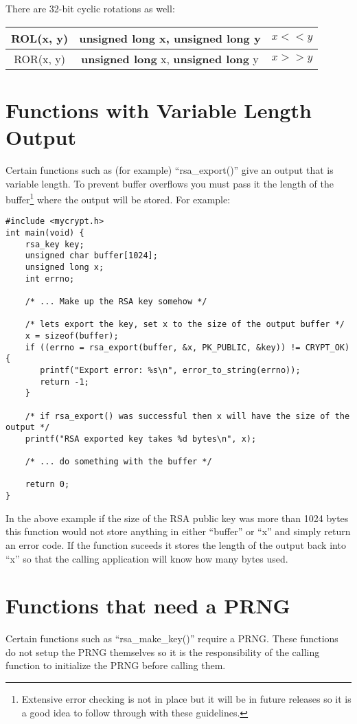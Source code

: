 \documentclass[b5paper]{book}
\begin{document}
There are 32-bit cyclic rotations as well:
 
\begin{center}
\begin{tabular}{|c|c|c|}
     \hline ROL(x, y) & {\bf unsigned long} x, {\bf unsigned long} y & $x << y$ \\
     \hline ROR(x, y) & {\bf unsigned long} x, {\bf unsigned long} y & $x >> y$ \\
     \hline
\end{tabular}
\end{center}

\section{Functions with Variable Length Output}
Certain functions such as (for example) ``rsa\_export()'' give an output that is variable length.  To prevent buffer overflows you
must pass it the length of the buffer\footnote{Extensive error checking is not in place but it will be in future releases so it is a good idea to follow through with these guidelines.} where
the output will be stored.  For example:
\begin{small}
\begin{verbatim}
#include <mycrypt.h>
int main(void) {
    rsa_key key;
    unsigned char buffer[1024];
    unsigned long x;
    int errno;

    /* ... Make up the RSA key somehow */

    /* lets export the key, set x to the size of the output buffer */
    x = sizeof(buffer);
    if ((errno = rsa_export(buffer, &x, PK_PUBLIC, &key)) != CRYPT_OK) {
       printf("Export error: %s\n", error_to_string(errno));
       return -1;
    }
    
    /* if rsa_export() was successful then x will have the size of the output */
    printf("RSA exported key takes %d bytes\n", x);

    /* ... do something with the buffer */

    return 0;
}
\end{verbatim}
\end{small}
In the above example if the size of the RSA public key was more than 1024 bytes this function would not store anything in
either ``buffer'' or ``x'' and simply return an error code.  If the function suceeds it stores the length of the output
back into ``x'' so that the calling application will know how many bytes used.

\section{Functions that need a PRNG}
Certain functions such as ``rsa\_make\_key()'' require a PRNG.  These functions do not setup the PRNG themselves so it is 
the responsibility of the calling function to initialize the PRNG before calling them.
\end{document}
